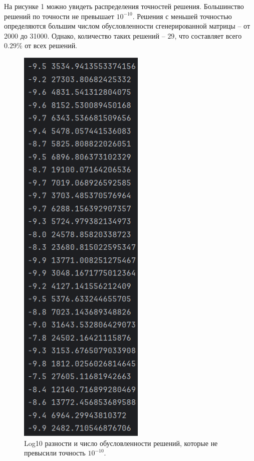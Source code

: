     На рисунке 1 можно увидеть распределения точностей решения. Большинство решений по точности не превышает $10^{-10}$. Решения с меньшей точностью определяются большим числом обусловленности сгенерированной матрицы -- от 2000 до 31000. Однако, количество таких решений -- $29$, что составляет всего $0.29 \% $ от всех решений.

    \begin{figure}[H]
        \centering
        \includegraphics[width=6cm]{pictures/BigConditions.png}
        \caption{Log10 разности и число обусловленности решений, которые не превысили точность $10^{-10}$.}
    \end{figure}
